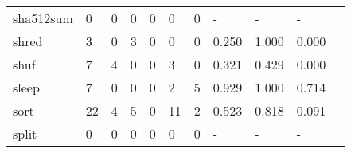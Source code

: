 \begin{longtable}{lp{1.2cm}p{1.2cm}p{1.2cm}p{1.2cm}p{1.2cm}p{1.2cm}p{1.2cm}p{1.2cm}p{1.2cm}p{1.2cm}}
sha512sum &                                     0 &                                                  0 &                                                0 &                                               0 &                                                0 &                                              0 &                                             - &                                                  - &                                                  - \\
shred     &                                     3 &                                                  0 &                                                3 &                                               0 &                                                0 &                                              0 &                                         0.250 &                                              1.000 &                                              0.000 \\
shuf      &                                     7 &                                                  4 &                                                0 &                                               0 &                                                3 &                                              0 &                                         0.321 &                                              0.429 &                                              0.000 \\
sleep     &                                     7 &                                                  0 &                                                0 &                                               0 &                                                2 &                                              5 &                                         0.929 &                                              1.000 &                                              0.714 \\
sort      &                                    22 &                                                  4 &                                                5 &                                               0 &                                               11 &                                              2 &                                         0.523 &                                              0.818 &                                              0.091 \\
split     &                                     0 &                                                  0 &                                                0 &                                               0 &                                                0 &                                              0 &                                             - &                                                  - &                                                  - \\

\end{longtable}
